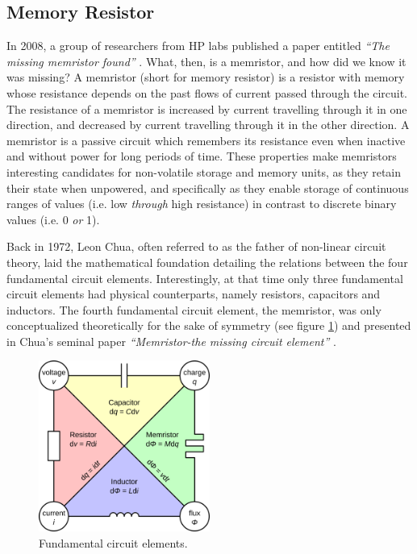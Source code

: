 \subsection{Memory Resistor}


In 2008, a group of researchers from HP labs published a paper entitled \textit{``The missing memristor found''} \cite{hp_memristor_found}. What, then, is a memristor, and how did we know it was missing? A memristor (short for memory resistor) is a resistor with memory whose resistance depends on the past flows of current passed through the circuit. The resistance of a memristor is increased by current travelling through it in one direction, and decreased by current travelling through it in the other direction. A memristor is a passive circuit which remembers its resistance even when inactive and without power for long periods of time. These properties make memristors interesting candidates for non-volatile storage and memory units, as they retain their state when unpowered, and specifically as they enable storage of continuous ranges of values (i.e. low \textit{through} high resistance) in contrast to discrete binary values (i.e. 0 \textit{or} 1).

Back in 1972, Leon Chua, often referred to as the father of non-linear circuit theory, laid the mathematical foundation detailing the relations between the four fundamental circuit elements. Interestingly, at that time only three fundamental circuit elements had physical counterparts, namely resistors, capacitors and inductors. The fourth fundamental circuit element, the memristor, was only conceptualized theoretically for the sake of symmetry (see figure \ref{fig:circuit_elements}) and presented in Chua's seminal paper \textit{``Memristor-the missing circuit element''} \cite{chua_memristor}.

\begin{figure}[htbp]
	\begin{center}
		\includegraphics[width=0.5\textwidth]{inc/circuit_elements.png}
		\caption{Fundamental circuit elements.\protect\footnotemark}
		\label{fig:circuit_elements}
	\end{center}
\end{figure}

